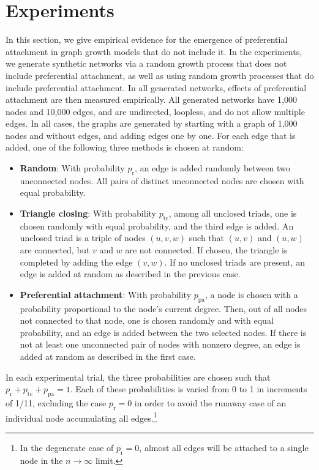 \documentclass{jimis-final-en}
\begin{document}
\section{Experiments}
In this section, we give empirical evidence for the emergence of
preferential attachment in graph growth models that do not include it. 
In the experiments, we generate synthetic networks via a random growth
process that does not include preferential attachment, as well as
using random growth processes that do include preferential attachment.
In all generated networks, effects of preferential attachment are then
measured empirically. 
All generated
networks have 1,000 nodes and 10,000 edges, and are undirected, loopless, and
do not allow multiple edges.  In all cases, the graphs are generated by
starting with a graph of 1,000 nodes and without edges, and adding edges
one by one. 
For each edge that is added, one of the following three methods is
chosen at random: 
\begin{itemize}
  \item \textbf{Random}:  With probability $p_{\mathrm{r}}$, an edge is added randomly between two
    unconnected nodes.  All pairs of distinct unconnected nodes are chosen with
    equal probability. 
  \item \textbf{Triangle closing}:  With probability $p_{\mathrm{tc}}$, among all unclosed triads, one is
    chosen randomly with equal probability, and the third edge is
    added.  An unclosed triad is a triple of nodes $(u,v,w)$ such that
    $(u,v)$ and $(u,w)$ are connected, but $v$ and $w$ are not connected.
    If chosen, the triangle is completed by adding the edge $(v,w)$.  If
    no unclosed triads are present, an edge is added at random as
    described in the previous case.
  \item \textbf{Preferential attachment}: With probability $p_{\mathrm{pa}}$, a node is chosen with a
    probability proportional to the node's current degree.  Then,
    out of all nodes not connected to that node, one is chosen randomly
    and with equal probability, and an edge is added between the two
    selected nodes.  If there is not at least one unconnected pair of nodes with nonzero degree,
    an edge is added at random as described in the first case. 
\end{itemize}
In each experimental trial, the three probabilities are chosen such that 
$p_{\mathrm r} + p_{\mathrm{tc}} + p_{\mathrm{pa}} = 1$.  Each of these probabilities
is varied from 0 to 1 in increments of 1/11, excluding the case
$p_{\mathrm r}=0$ in order to avoid the runaway case of an individual node
accumulating all edges.\footnote{In the degenerate case of $p_{\mathrm r}=0$,
  almost all edges will be attached to a single node in the $n
  \rightarrow \infty$ limit.} 
\end{document}
